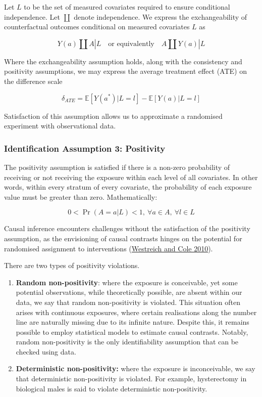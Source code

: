 \documentclass[
  singlecolumn]{article}
\begin{document}
Let \(L\) to be the set of measured covariates required to ensure
conditional independence. Let \(\coprod\) denote independence. We
express the exchangeability of counterfactual outcomes conditional on
measured covariates \(L\) as

\[
Y(a) \coprod  A|L \quad \text{or equivalently} \quad A \coprod  Y(a)|L
\]

Where the exchangeability assumption holds, along with the consistency
and positivity assumptions, we may express the average treatment effect
(ATE) on the difference scale

\[
\delta_{ATE}  = \mathbb{E}[Y(a^*)|L = l] - \mathbb{E}[Y(a)|L = l]
\]

Satisfaction of this assumption allows us to approximate a randomised
experiment with observational data.

\hypertarget{identification-assumption-3-positivity}{%
\subsubsection{Identification Assumption 3:
Positivity}\label{identification-assumption-3-positivity}}

The positivity assumption is satisfied if there is a non-zero
probability of receiving or not receiving the exposure within each level
of all covariates. In other words, within every stratum of every
covariate, the probability of each exposure value must be greater than
zero. Mathematically:

\[
0 < \Pr(A=a|L)<1, ~ \forall a \in A, ~ \forall l \in L
\]

Causal inference encounters challenges without the satisfaction of the
positivity assumption, as the envisioning of causal contrasts hinges on
the potential for randomised assignment to interventions
(\protect\hyperlink{ref-westreich2010}{Westreich and Cole 2010}).

There are two types of positivity violations.

\begin{enumerate}
\def\labelenumi{\arabic{enumi}.}
\item
  \textbf{Random non-positivity}: where the exposure is conceivable, yet
  some potential observations, while theoretically possible, are absent
  within our data, we say that random non-positivity is violated. This
  situation often arises with continuous exposures, where certain
  realisations along the number line are naturally missing due to its
  infinite nature. Despite this, it remains possible to employ
  statistical models to estimate causal contrasts. Notably, random
  non-positivity is the only identifiability assumption that can be
  checked using data.
\item
  \textbf{Deterministic non-positivity:} where the exposure is
  inconceivable, we say that deterministic non-positivity is violated.
  For example, hysterectomy in biological males is said to violate
  deterministic non-positivity.
\end{enumerate}
\end{document}
